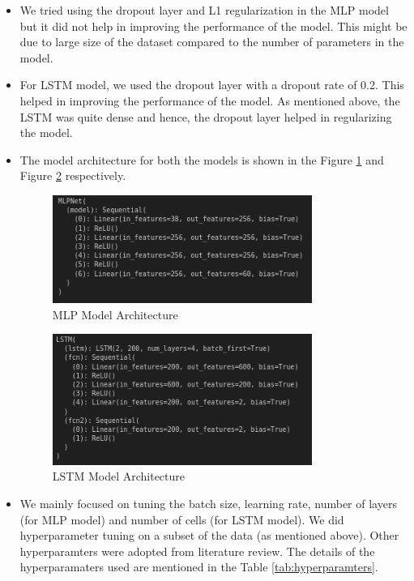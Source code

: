 \documentclass{article}
\begin{document}
\begin{itemize}
  \item We tried using the dropout layer and L1 regularization in the MLP model but it did not help in improving the performance of the model. This might be due to large size of the dataset compared to the number of parameters in the model.
  \item For LSTM model, we used the dropout layer with a dropout rate of 0.2. This helped in improving the performance of the model. As mentioned above, the LSTM was quite dense and hence, the dropout layer helped in regularizing the model.
  \item The model architecture for both the models is shown in the Figure \ref{fig:mlp} and Figure \ref{fig:lstm} respectively.
  \begin{figure}
    \centering
    \includegraphics[width=0.8\textwidth]{mlp.png}
    \caption{MLP Model Architecture}
    \label{fig:mlp}
  \end{figure}
  \begin{figure}
    \centering
    \includegraphics[width=0.8\textwidth]{lstm.png}
    \caption{LSTM Model Architecture}
    \label{fig:lstm}
  \end{figure}
  \item We mainly focused on tuning the batch size, learning rate, number of layers (for MLP model) and number of cells (for LSTM model). We did hyperparameter tuning on a subset of the data (as mentioned above). Other hyperparamters were adopted from literature review.
  The details of the hyperparamaters used are mentioned in the Table \ref{tab:hyperparamters}.

\end{itemize}
\end{document}
